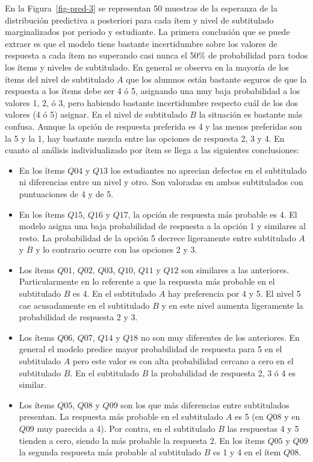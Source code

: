 \documentclass[
  12pt,
  a4paper,
  extrafontsizes,
  onecolumn,
  openright,
  table]{memoir}
\begin{document}
\normalsize

En la Figura~\ref{fig-pred-3} se representan 50 muestras de la esperanza
de la distribución predictiva a posteriori para cada ítem y nivel de
subtitulado marginalizados por periodo y estudiante. La primera
conclusión que se puede extraer es que el modelo tiene bastante
incertidumbre sobre los valores de respuesta a cada ítem no superando
casi nunca el 50\% de probabilidad para todos los ítems y niveles de
subtitulado. En general se observa en la mayoría de los ítems del nivel
de subtitulado \(A\) que los alumnos están bastante seguros de que la
respuesta a los ítems debe ser 4 ó 5, asignando una muy baja
probabilidad a los valores 1, 2, ó 3, pero habiendo bastante
incertidumbre respecto cuál de los dos valores (4 ó 5) asignar. En el
nivel de subtitulado \(B\) la situación es bastante más confusa. Aunque
la opción de respuesta preferida es 4 y las menos preferidas son la 5 y
la 1, hay bastante mezcla entre las opciones de respuesta 2, 3 y 4. En
cuanto al análisis individualizado por ítem se llega a las siguientes
conclusiones:

\begin{itemize}
\item
  En los ítems \(Q04\) y \(Q13\) los estudiantes no aprecian defectos en
  el subtitulado ni diferencias entre un nivel y otro. Son valoradas en
  ambos subtitulados con puntuaciones de 4 y de 5.
\item
  En los ítems \(Q15\), \(Q16\) y \(Q17\), la opción de respuesta más
  probable es 4. El modelo asigna una baja probabilidad de respuesta a
  la opción 1 y similares al resto. La probabilidad de la opción 5
  decrece ligeramente entre subtitulado \(A\) y \(B\) y lo contrario
  ocurre con las opciones 2 y 3.
\item
  Los ítems \(Q01\), \(Q02\), \(Q03\), \(Q10\), \(Q11\) y \(Q12\) son
  similares a las anteriores. Particularmente en lo referente a que la
  respuesta más probable en el subtitulado \(B\) es 4. En el subtitulado
  \(A\) hay preferencia por 4 y 5. El nivel 5 cae acusadamente en el
  subtitulado \(B\) y en este nivel aumenta ligeramente la probabilidad
  de respuesta 2 y 3.
\item
  Los ítems \(Q06\), \(Q07\), \(Q14\) y \(Q18\) no son muy diferentes de
  los anteriores. En general el modelo predice mayor probabilidad de
  respuesta para 5 en el subtitulado \(A\) pero este valor es con alta
  probabilidad cercano a cero en el subtitulado \(B\). En el subtitulado
  \(B\) la probabilidad de respuesta 2, 3 ó 4 es similar.
\item
  Los ítems \(Q05\), \(Q08\) y \(Q09\) son los que más diferencias entre
  subtitulados presentan. La respuesta más probable en el subtitulado
  \(A\) es 5 (en \(Q08\) y en \(Q09\) muy parecida a 4). Por contra, en
  el subtitulado \(B\) las respuestas 4 y 5 tienden a cero, siendo la
  más probable la respuesta 2. En los ítems \(Q05\) y \(Q09\) la segunda
  respuesta más probable al subtitulado \(B\) es 1 y 4 en el ítem
  \(Q08\).
\end{itemize}
\end{document}

